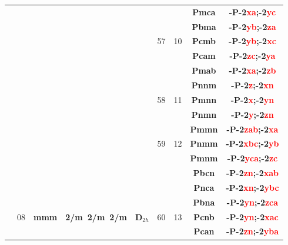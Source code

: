 \documentclass{article}      %
\begin{document}
\begin{small}
\begin{longtable}[c]{|c|c|c|c|c|c|c|c|c|}
          &  & & & &  & &\textbf{Pmca}         &\textbf{-P-2\textcolor{red}{xa};-2\textcolor{red}{yc}}\\\cline{8-9}       
          &  & & & &  & &\textbf{Pbma}         &\textbf{-P-2\textcolor{red}{yb};-2\textcolor{red}{za}}\\\cline{8-9}       
	  &  & & & &\textrm{57}  &\textrm{10} &\textbf{Pcmb}         &\textbf{-P-2\textcolor{red}{yb};-2\textcolor{red}{xc}}\\\cline{8-9}       
          &  & & & &  & &\textbf{Pcam}         &\textbf{-P-2\textcolor{red}{zc};-2\textcolor{red}{ya}}\\\cline{8-9}       
          &  & & & &  & &\textbf{Pmab}         &\textbf{-P-2\textcolor{red}{xa};-2\textcolor{red}{zb}}\\\cline{6-9}       
          &  & & & &  & &\textbf{Pnnm}         &\textbf{-P-2\textcolor{red}{z};-2\textcolor{red}{xn}}\\\cline{8-9}        
	  &  & & & &\textrm{58}  &\textrm{11} &\textbf{Pmnn}         &\textbf{-P-2\textcolor{red}{x};-2\textcolor{red}{yn}}\\\cline{8-9}        
          &  & & & &  & &\textbf{Pnmn}         &\textbf{-P-2\textcolor{red}{y};-2\textcolor{red}{zn}}\\\cline{6-9}        
          &  & & & &  & &\textbf{Pmmn}         &\textbf{-P-2\textcolor{red}{zab};-2\textcolor{red}{xa}}\\\cline{8-9}      
	  &  & & & &\textrm{59}  &\textrm{12} &\textbf{Pnmm}         &\textbf{-P-2\textcolor{red}{xbc};-2\textcolor{red}{yb}}\\\cline{8-9}      
          &  & & & &  & &\textbf{Pmnm}         &\textbf{-P-2\textcolor{red}{yca};-2\textcolor{red}{zc}}\\\cline{6-9}      
          &  & & & &  & &\textbf{Pbcn}         &\textbf{-P-2\textcolor{red}{zn};-2\textcolor{red}{xab}}\\\cline{8-9}      
          &  & & & &  & &\textbf{Pnca}         &\textbf{-P-2\textcolor{red}{xn};-2\textcolor{red}{ybc}}\\\cline{8-9}      
          &  & & & &  & &\textbf{Pbna}         &\textbf{-P-2\textcolor{red}{yn};-2\textcolor{red}{zca}}\\\cline{8-9}      
	  & \textrm{08} &\textbf{mmm} &\textbf{2/m~2/m~2/m}  &$\mathbf{D}_{2h}$ &\textrm{60}  &\textrm{13} &\textbf{Pcnb}         &\textbf{-P-2\textcolor{red}{yn};-2\textcolor{red}{xac}}\\\cline{8-9}      
          &  & & & &  & &\textbf{Pcan}         &\textbf{-P-2\textcolor{red}{zn};-2\textcolor{red}{yba}}\\\cline{8-9}      

\end{longtable}
\end{small}
\end{document}
